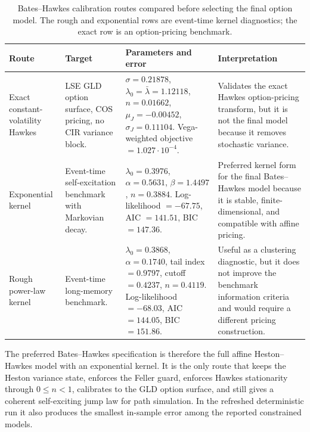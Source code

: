 \documentclass[a4paper,10pt,titlepage,oneside,openany]{book}
\theoremstyle{plain}
\theoremstyle{definition}
\theoremstyle{remark}
\begin{document}
\begin{table}[H]
\centering
\scriptsize
\setlength{\tabcolsep}{2.8pt}
\begin{tabularx}{\textwidth}{@{}>{\RaggedRight\arraybackslash}p{2.3cm}>{\RaggedRight\arraybackslash}p{2.9cm}>{\RaggedRight\arraybackslash}p{4.6cm}>{\RaggedRight\arraybackslash}X@{}}
\toprule
\textbf{Route} & \textbf{Target} & \textbf{Parameters and error} & \textbf{Interpretation} \\
\midrule
Exact constant-volatility Hawkes & LSE GLD option surface, COS pricing, no CIR variance block. & \(\sigma=0.21878\), \(\lambda_0=\bar{\lambda}=1.12118\), \(n=0.01662\), \(\mu_J=-0.00452\), \(\sigma_J=0.11104\). Vega-weighted objective \(=1.027\cdot10^{-4}\). & Validates the exact Hawkes option-pricing transform, but it is not the final model because it removes stochastic variance. \\
Exponential kernel & Event-time self-excitation benchmark with Markovian decay. & \(\lambda_0=0.3976\), \(\alpha=0.5631\), \(\beta=1.4497\), \(n=0.3884\). Log-likelihood \(=-67.75\), AIC \(=141.51\), BIC \(=147.36\). & Preferred kernel form for the final Bates--Hawkes model because it is stable, finite-dimensional, and compatible with affine pricing. \\
Rough power-law kernel & Event-time long-memory benchmark. & \(\lambda_0=0.3868\), \(\alpha=0.1740\), tail index \(=0.9797\), cutoff \(=0.4237\), \(n=0.4119\). Log-likelihood \(=-68.03\), AIC \(=144.05\), BIC \(=151.86\). & Useful as a clustering diagnostic, but it does not improve the benchmark information criteria and would require a different pricing construction. \\
\bottomrule
\end{tabularx}
\caption{Bates--Hawkes calibration routes compared before selecting the final option model. The rough and exponential rows are event-time kernel diagnostics; the exact row is an option-pricing benchmark.}
\label{tab:hawkes-methods}
\end{table}

The preferred Bates--Hawkes specification is therefore the full affine Heston--Hawkes model with an exponential kernel. It is the only route that keeps the Heston variance state, enforces the Feller guard, enforces Hawkes stationarity through \(0\leq n<1\), calibrates to the GLD option surface, and still gives a coherent self-exciting jump law for path simulation. In the refreshed deterministic run it also produces the smallest in-sample error among the reported constrained models.
\end{document}

